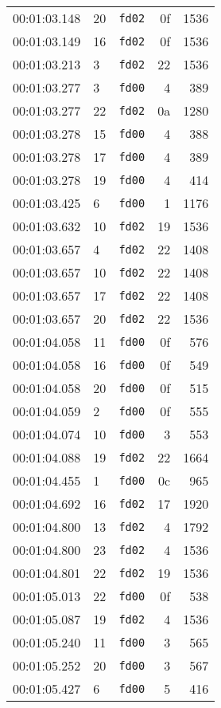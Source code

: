 \documentclass{article}
\begin{document}
\begin{longtable}{lllrr}
00:01:03.148 & 20 & \texttt{fd02} & 0f & 1536 \\
00:01:03.149 & 16 & \texttt{fd02} & 0f & 1536 \\
00:01:03.213 & 3 & \texttt{fd02} & 22 & 1536 \\
00:01:03.277 & 3 & \texttt{fd00} & 4 & 389 \\
00:01:03.277 & 22 & \texttt{fd02} & 0a & 1280 \\
00:01:03.278 & 15 & \texttt{fd00} & 4 & 388 \\
00:01:03.278 & 17 & \texttt{fd00} & 4 & 389 \\
00:01:03.278 & 19 & \texttt{fd00} & 4 & 414 \\
00:01:03.425 & 6 & \texttt{fd00} & 1 & 1176 \\
00:01:03.632 & 10 & \texttt{fd02} & 19 & 1536 \\
00:01:03.657 & 4 & \texttt{fd02} & 22 & 1408 \\
00:01:03.657 & 10 & \texttt{fd02} & 22 & 1408 \\
00:01:03.657 & 17 & \texttt{fd02} & 22 & 1408 \\
00:01:03.657 & 20 & \texttt{fd02} & 22 & 1536 \\
00:01:04.058 & 11 & \texttt{fd00} & 0f & 576 \\
00:01:04.058 & 16 & \texttt{fd00} & 0f & 549 \\
00:01:04.058 & 20 & \texttt{fd00} & 0f & 515 \\
00:01:04.059 & 2 & \texttt{fd00} & 0f & 555 \\
00:01:04.074 & 10 & \texttt{fd00} & 3 & 553 \\
00:01:04.088 & 19 & \texttt{fd02} & 22 & 1664 \\
00:01:04.455 & 1 & \texttt{fd00} & 0c & 965 \\
00:01:04.692 & 16 & \texttt{fd02} & 17 & 1920 \\
00:01:04.800 & 13 & \texttt{fd02} & 4 & 1792 \\
00:01:04.800 & 23 & \texttt{fd02} & 4 & 1536 \\
00:01:04.801 & 22 & \texttt{fd02} & 19 & 1536 \\
00:01:05.013 & 22 & \texttt{fd00} & 0f & 538 \\
00:01:05.087 & 19 & \texttt{fd02} & 4 & 1536 \\
00:01:05.240 & 11 & \texttt{fd00} & 3 & 565 \\
00:01:05.252 & 20 & \texttt{fd00} & 3 & 567 \\
00:01:05.427 & 6 & \texttt{fd00} & 5 & 416 \\

\end{longtable}
\end{document}
